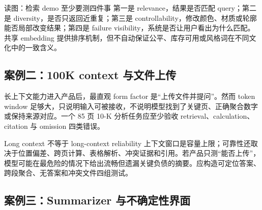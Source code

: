 


\begin{knowledgebox}{读图：检索 demo 至少要测四件事}
第一是 relevance，结果是否匹配 query；第二是 diversity，是否只返回近重复；第三是 controllability，修改颜色、材质或轮廓能否局部改变结果；第四是 failure visibility，系统是否让用户看出为什么匹配。共享 embedding 提供排序机制，但不自动保证公平、库存可用或风格词在不同文化中的一致含义。
\end{knowledgebox}

\subsection{案例二：100K context 与文件上传}

长上下文能力进入产品后，最直观 form factor 是“上传文件并提问”。然而 token window 足够大，只说明输入可被接收，不说明模型找到了关键页、正确聚合数字或保持来源对应。一个 85 页 10-K 分析任务应至少验收 retrieval、calculation、citation 与 omission 四类错误。




\begin{warningbox}{Long context 不等于 long-context reliability}
上下文窗口是容量上限；可靠性还取决于位置偏差、跨页计算、表格解析、冲突证据和引用。若产品只测“能否上传”，模型可能在最危险的情况下给出流畅但遗漏关键负债的摘要。应构造可定位答案、跨段聚合、无答案和冲突文件四组测试。
\end{warningbox}

\subsection{案例三：Summarizer 与不确定性界面}

